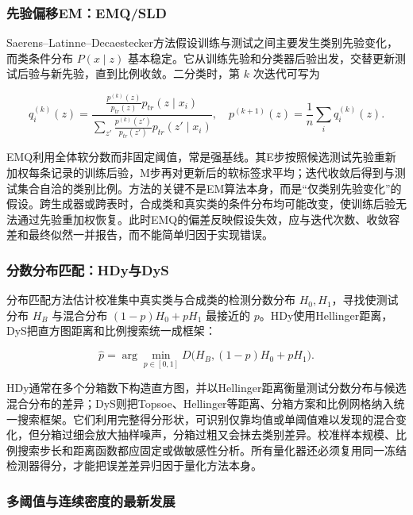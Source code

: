 \documentclass[
  chinese,
  12pt,
  a4paper,
  chinese,
  UTF8]{ctexart}
\begin{document}
\subsubsection{先验偏移EM：EMQ/SLD}\label{ux5148ux9a8cux504fux79fbememqsld}

Saerens--Latinne--Decaestecker方法假设训练与测试之间主要发生类别先验变化，而类条件分布
\(P(x\mid z)\)
基本稳定\autocite{saerens2002emq}。它从训练先验和分类器后验出发，交替更新测试后验与新先验，直到比例收敛。二分类时，第
\(k\) 次迭代可写为

\[q_i^{(k)}(z)=\frac{\frac{p^{(k)}(z)}{p_{tr}(z)}p_{tr}(z\mid x_i)}
{\sum_{z'}\frac{p^{(k)}(z')}{p_{tr}(z')}p_{tr}(z'\mid x_i)},\quad
p^{(k+1)}(z)=\frac1n\sum_i q_i^{(k)}(z).\]

EMQ利用全体软分数而非固定阈值，常是强基线。其E步按照候选测试先验重新加权每条记录的训练后验，M步再对更新后的软标签求平均；迭代收敛后得到与测试集合自洽的类别比例。方法的关键不是EM算法本身，而是``仅类别先验变化''的假设。跨生成器或跨表时，合成类和真实类的条件分布均可能改变，使训练后验无法通过先验重加权恢复。此时EMQ的偏差反映假设失效，应与迭代次数、收敛容差和最终似然一并报告，而不能简单归因于实现错误。

\subsubsection{分数分布匹配：HDy与DyS}\label{ux5206ux6570ux5206ux5e03ux5339ux914dhdyux4e0edys}

分布匹配方法估计校准集中真实类与合成类的检测分数分布
\(H_0,H_1\)，寻找使测试分布 \(H_B\) 与混合分布 \((1-p)H_0+pH_1\)
最接近的
\(p\)。HDy使用Hellinger距离，DyS把直方图距离和比例搜索统一成框架\autocite{maletzke2019dys}：

\[\hat p=\arg\min_{p\in[0,1]}D\big(H_B,(1-p)H_0+pH_1\big).\]

HDy通常在多个分箱数下构造直方图，并以Hellinger距离衡量测试分数分布与候选混合分布的差异；DyS则把Topsoe、Hellinger等距离、分箱方案和比例网格纳入统一搜索框架。它们利用完整得分形状，可识别仅靠均值或单阈值难以发现的混合变化，但分箱过细会放大抽样噪声，分箱过粗又会抹去类别差异。校准样本规模、比例搜索步长和距离函数都应固定或做敏感性分析。所有量化器还必须复用同一冻结检测器得分，才能把误差差异归因于量化方法本身。

\subsubsection{多阈值与连续密度的最新发展}\label{ux591aux9608ux503cux4e0eux8fdeux7eedux5bc6ux5ea6ux7684ux6700ux65b0ux53d1ux5c55}
\end{document}
